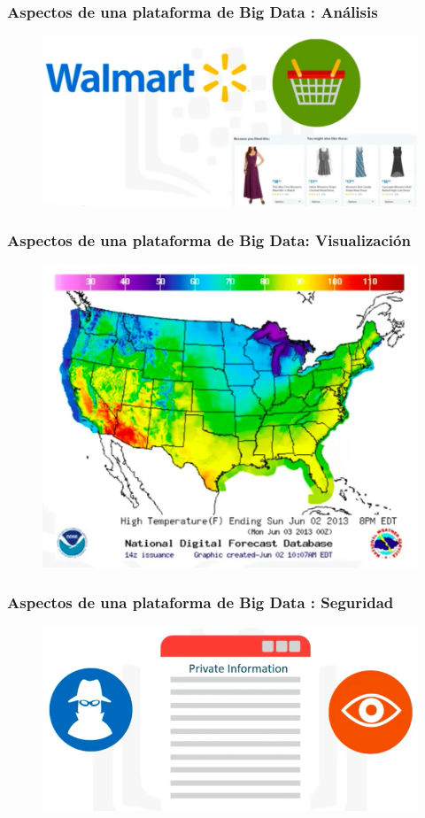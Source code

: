 \documentclass{beamer}
\begin{document}
\begin{frame}
\frametitle{Aspectos de una plataforma de Big Data : An\'alisis}
\begin{figure}
\includegraphics[scale=0.3]{img/3_Analysis}
\end{figure}
\end{frame}

\begin{frame}
\frametitle{Aspectos de una plataforma de Big Data: Visualizaci\'on}
\begin{figure}
\includegraphics[scale=0.4]{img/3_Visualization}
\end{figure}
\end{frame}

\begin{frame}
\frametitle{Aspectos de una plataforma de Big Data : Seguridad}
\begin{figure}
\includegraphics[scale=0.35]{img/3_Security}
\end{figure}
\end{frame}
\end{document}
